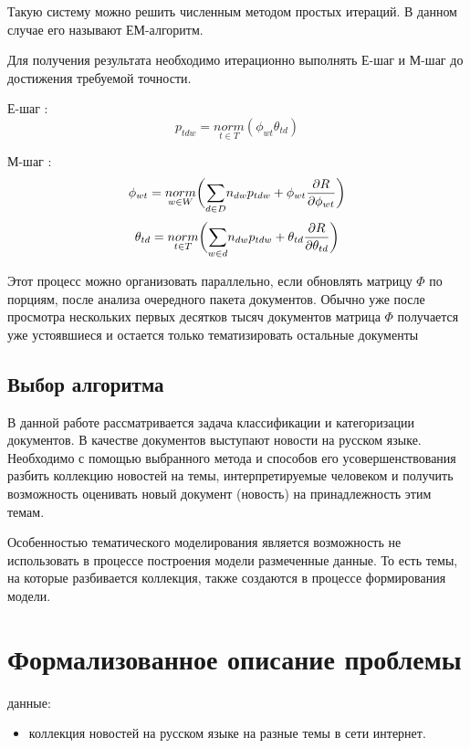 Такую систему можно решить численным методом простых итераций. В данном случае его называют  ЕМ-алгоритм.

Для получения результата необходимо итерационно выполнять Е-шаг и М-шаг до достижения требуемой точности.

Е-шаг :
$$
p_{tdw}=\underset{t \in T}{norm}(\phi_{wt} \theta_{td})
$$

М-шаг : 
$$
\phi_{wt} = \underset{w \in W}{norm}\bigg( \underset{d \in D}\sum{n_{dw} p_{tdw} + \phi_{wt} {{\partial R} \over {\partial \phi_{wt}}}} \bigg)
$$
$$
\theta_{td} = \underset{t \in T}{norm}\bigg( \underset{w \in d}\sum{n_{dw} p_{tdw} + \theta_{td} {{\partial R} \over {\partial \theta_{td}}}} \bigg)
$$

Этот процесс можно организовать параллельно, если обновлять матрицу   $\Phi$ по порциям, после анализа очередного пакета документов. Обычно уже после просмотра нескольких первых десятков тысяч документов матрица $\Phi$ получается уже устоявшиеся и остается только тематизировать остальные документы 


\subsection{Выбор алгоритма}

В данной работе рассматривается задача \todo{}классификации и категоризации документов. В качестве документов выступают новости на русском языке. Необходимо с помощью выбранного метода и способов его усовершенствования разбить коллекцию новостей на темы, интерпретируемые человеком и получить возможность оценивать новый документ (новость) на принадлежность этим темам.

Особенностью тематического моделирования является возможность не использовать в процессе построения модели размеченные данные. То есть темы, на которые разбивается коллекция, также создаются в процессе формирования модели. 

\section{Формализованное описание проблемы}

 данные:

\begin{itemize}
    \item коллекция новостей на русском языке на разные темы в сети интернет.
\end{itemize}

